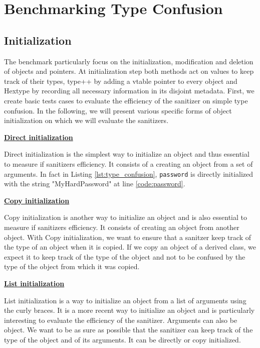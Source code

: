 \documentclass[a4paper,11pt,oneside]{report}
\begin{document}
\section{Benchmarking Type Confusion}

\subsection{Initialization}

The benchmark particularly focus on the initialization, modification and deletion of objects and pointers. At initialization step 
both methods act on values to keep track of their types, type++ by adding a vtable pointer to every object and Hextype by 
recording all necessary information in its disjoint metadata. 
First, we create basic tests cases to evaluate the efficiency of the sanitizer 
on simple type confusion. In the following, we will present various specific forms of object initialization on which 
we will evaluate the sanitizers.

\textbf{\href{https://en.cppreference.com/w/cpp/language/direct_initialization}{Direct initialization}}

\noindent{} Direct initialization is the simplest way to initialize an object and thus essential to measure if 
sanitizers efficiency. It consists of a creating an object from a set of arguments. 
In fact in Listing \autoref{lst:type_confusion}, \texttt{password} is directly initialized with the string "MyHardPassword"
at line \ref{code:password}. 

\textbf{\href{https://en.cppreference.com/w/cpp/language/copy_initialization}{Copy initialization}}

\noindent{} Copy initialization is another way to initialize an object and is also essential to measure if
sanitizers efficiency. It consists of creating an object from another object. With Copy initialization, we want to 
ensure that a sanitzer keep track of the type of an object when it is copied. If we copy an object of a derived class,
we expect it to keep track of the type of the object and not to be confused by the type of the object from which it was copied.

\textbf{\href{https://en.cppreference.com/w/cpp/language/list_initialization}{List initialization}}

\noindent{} List initialization is a way to initialize an object from a list of arguments using the curly braces.
It is a more recent way to initialize an object and is particularly interesting to evaluate the efficiency of the sanitizer.
Arguments can also be object. We want to be as sure as possible that the sanitizer can keep track of the type of the object
and of its arguments. It can be directly or copy initialized.
\end{document}

